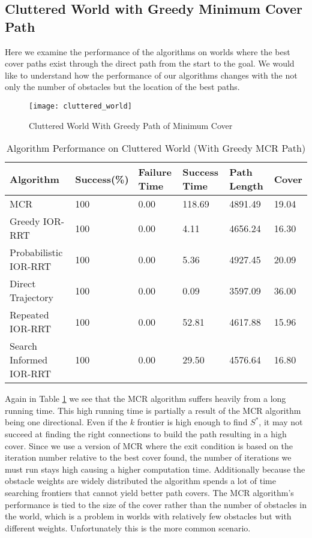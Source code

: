 \subsection{Cluttered World with Greedy Minimum Cover Path} \label{res:cluttered_world}
Here we examine the performance of the algorithms on worlds where the best cover paths exist through the direct path from the start to the goal. We would like to understand how the performance of our algorithms changes with the not only the number of obstacles but the location of the best paths.

\begin{figure}[h!]
    \centering
    \texttt{[image: cluttered\_world]}
    \caption{Cluttered World With Greedy Path of Minimum Cover}
    \label{fig:cluttered_world}
\end{figure}

\begin{table}[h!]
\centering
\begin{tabular}{@{}llllll@{}}
\toprule
Algorithm & Success(\%)  & Failure Time  & Success Time  & Path Length & Cover\\ 
\midrule
MCR & 100 & 0.00 & 118.69 & 4891.49 & 19.04 \\
Greedy IOR-RRT & 100 & 0.00 & 4.11 & 4656.24 & 16.30 \\
Probabilistic IOR-RRT & 100 & 0.00 & 5.36 & 4927.45 & 20.09 \\
Direct Trajectory & 100 & 0.00 & 0.09 & 3597.09 & 36.00 \\
Repeated IOR-RRT & 100 & 0.00 & 52.81 & 4617.88 & 15.96 \\
Search Informed IOR-RRT & 100 & 0.00 & 29.50 & 4576.64 & 16.80 \\
\bottomrule
\end{tabular}
\caption{Algorithm Performance on Cluttered World (With Greedy MCR Path)}
\label{tab:cluttered_world}
\end{table}

Again in Table \ref{tab:cluttered_world} we see that the MCR algorithm suffers heavily from a long running time. This high running time is partially a result of the MCR algorithm being one directional. Even if the $k$ frontier is high enough to find $S^*$, it may not succeed at finding the right connections to build the path resulting in a high cover. Since we use a version of MCR where the exit condition is based on the iteration number relative to the best cover found, the number of iterations we must run stays high causing a higher computation time. Additionally because the obstacle weights are widely distributed the algorithm spends a lot of time searching frontiers that cannot yield better path covers. The MCR algorithm's performance is tied to the size of the cover rather than the number of obstacles in the world, which is a problem in worlds with relatively few obstacles but with different weights. Unfortunately this is the more common scenario.

